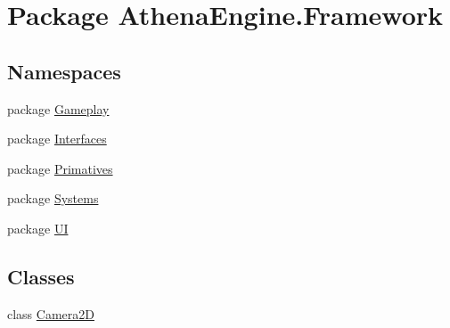 \hypertarget{namespace_athena_engine_1_1_framework}{\section{Package Athena\-Engine.\-Framework}
\label{namespace_athena_engine_1_1_framework}
}
\subsection*{Namespaces}
\begin{DoxyCompactItemize}
\item 
package \hyperlink{namespace_athena_engine_1_1_framework_1_1_gameplay}{Gameplay}
\item 
package \hyperlink{namespace_athena_engine_1_1_framework_1_1_interfaces}{Interfaces}
\item 
package \hyperlink{namespace_athena_engine_1_1_framework_1_1_primatives}{Primatives}
\item 
package \hyperlink{namespace_athena_engine_1_1_framework_1_1_systems}{Systems}
\item 
package \hyperlink{namespace_athena_engine_1_1_framework_1_1_u_i}{U\-I}
\end{DoxyCompactItemize}
\subsection*{Classes}
\begin{DoxyCompactItemize}
\item 
class \hyperlink{class_athena_engine_1_1_framework_1_1_camera2_d}{Camera2\-D}
\end{DoxyCompactItemize}
